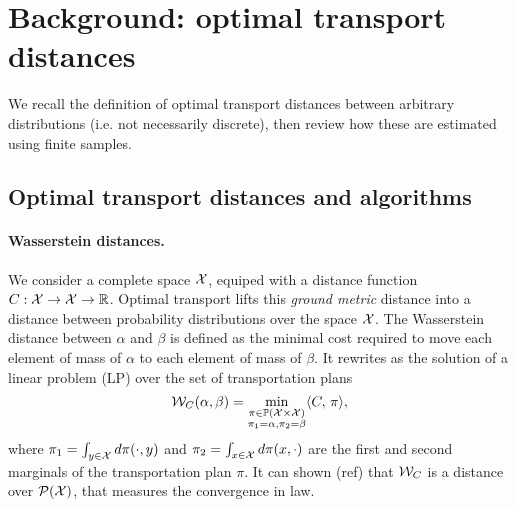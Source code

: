 \section{Background: optimal transport distances}

We recall the definition of optimal transport distances between arbitrary distributions (i.e. not necessarily discrete), then review how these are estimated using finite samples.

\subsection{Optimal transport distances and algorithms}

\paragraph{Wasserstein distances.} We consider a complete space $\mathcal{X}$, equiped
with a distance function $C: \mathcal{X} \to \mathcal{X} \to \mathbb{R}$. Optimal transport lifts this
\textit{ground metric} distance into a distance between probability
distributions over the space $\mathcal{X}$. The Wasserstein distance between $\alpha$
and $\beta$ is defined as the minimal cost required to move each element of mass
of $\alpha$ to each element of mass of $\beta$. It rewrites as the solution of a
linear problem (LP) over the set of transportation plans
\begin{equation}\label{eq:wass}
    \mathcal{W}_C(\alpha, \beta) = 
    \min_{
    \substack{
        \pi \in \mathbb{P}(\mathcal{X} \times \mathcal{X})\\\pi_1 = \alpha, \pi_2 = \beta
    }    
    } \langle C,\,\pi\rangle,
\end{equation}
where $\pi_1 = \int_{y\in \mathcal{X}} d \pi(\cdot, y)$ and $\pi_2 = \int_{x\in \mathcal{X}} d
\pi(x, \cdot)$ are the first and second marginals of the transportation plan $\pi$. It
can shown (ref) that $\mathcal{W}_C$ is a distance over $\mathcal{P}(\mathcal{X})$, that
measures the convergence in law.

